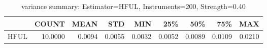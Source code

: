 \begin{table}[ht]
\centering
\caption{variance summary: Estimator=HFUL, Instruments=200, Strength=0.40}
\begin{tabular}{lrrrrrrrr}
\toprule
 & COUNT & MEAN & STD & MIN & 25\% & 50\% & 75\% & MAX \\
\midrule
HFUL & 10.0000 & 0.0094 & 0.0055 & 0.0032 & 0.0052 & 0.0089 & 0.0109 & 0.0210 \\
\bottomrule
\end{tabular}
\end{table}
